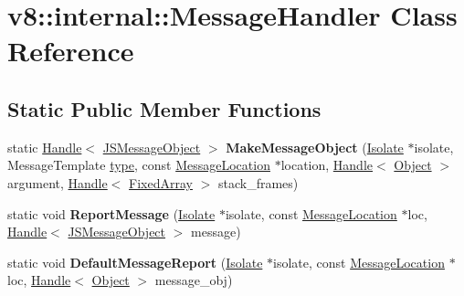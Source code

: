 \hypertarget{classv8_1_1internal_1_1MessageHandler}{}\section{v8\+:\+:internal\+:\+:Message\+Handler Class Reference}
\label{classv8_1_1internal_1_1MessageHandler}
\subsection*{Static Public Member Functions}
\begin{DoxyCompactItemize}
\item 
\mbox{\label{classv8_1_1internal_1_1MessageHandler_a9d588460327fc6eedd5089c13972f5ca}} 
static \mbox{\hyperlink{classv8_1_1internal_1_1Handle}{Handle}}$<$ \mbox{\hyperlink{classv8_1_1internal_1_1JSMessageObject}{J\+S\+Message\+Object}} $>$ {\bfseries Make\+Message\+Object} (\mbox{\hyperlink{classv8_1_1internal_1_1Isolate}{Isolate}} $\ast$isolate, Message\+Template \mbox{\hyperlink{classstd_1_1conditional_1_1type}{type}}, const \mbox{\hyperlink{classv8_1_1internal_1_1MessageLocation}{Message\+Location}} $\ast$location, \mbox{\hyperlink{classv8_1_1internal_1_1Handle}{Handle}}$<$ \mbox{\hyperlink{classv8_1_1internal_1_1Object}{Object}} $>$ argument, \mbox{\hyperlink{classv8_1_1internal_1_1Handle}{Handle}}$<$ \mbox{\hyperlink{classv8_1_1internal_1_1FixedArray}{Fixed\+Array}} $>$ stack\+\_\+frames)
\item 
\mbox{\label{classv8_1_1internal_1_1MessageHandler_a8c4beb413e36f0b01983e4d17109d0ed}} 
static void {\bfseries Report\+Message} (\mbox{\hyperlink{classv8_1_1internal_1_1Isolate}{Isolate}} $\ast$isolate, const \mbox{\hyperlink{classv8_1_1internal_1_1MessageLocation}{Message\+Location}} $\ast$loc, \mbox{\hyperlink{classv8_1_1internal_1_1Handle}{Handle}}$<$ \mbox{\hyperlink{classv8_1_1internal_1_1JSMessageObject}{J\+S\+Message\+Object}} $>$ message)
\item 
\mbox{\label{classv8_1_1internal_1_1MessageHandler_ac3187fbef495d0ee967c27a5edb8b591}} 
static void {\bfseries Default\+Message\+Report} (\mbox{\hyperlink{classv8_1_1internal_1_1Isolate}{Isolate}} $\ast$isolate, const \mbox{\hyperlink{classv8_1_1internal_1_1MessageLocation}{Message\+Location}} $\ast$loc, \mbox{\hyperlink{classv8_1_1internal_1_1Handle}{Handle}}$<$ \mbox{\hyperlink{classv8_1_1internal_1_1Object}{Object}} $>$ message\+\_\+obj)

\end{DoxyCompactItemize}

